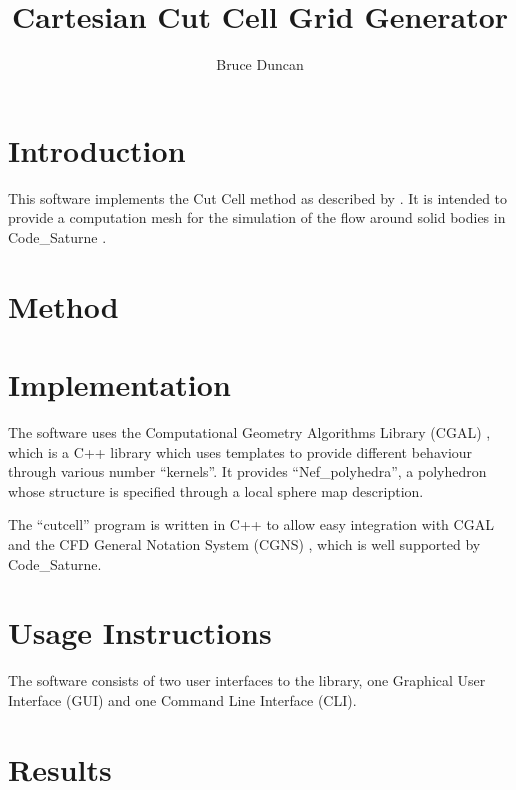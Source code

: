 \documentclass[a4paper,10pt]{article}
\title{Cartesian Cut Cell Grid Generator}
\author{Bruce Duncan}
\begin{document}
\maketitle

\section{Introduction}

This software implements the Cut Cell method as described by \cite{dingram}. It
is intended to provide a computation mesh for the simulation of the flow around
solid bodies in Code\_Saturne \cite{code_saturne}.

\section{Method}

\section{Implementation}

The software uses the Computational Geometry Algorithms Library (CGAL)
\cite{cgal}, which is a C++ library which uses templates to provide different
behaviour through various number ``kernels''. It provides ``Nef\_polyhedra'', a
polyhedron whose structure is specified through a local sphere map description.

The ``cutcell'' program is written in C++ to allow easy integration with CGAL
and the CFD General Notation System (CGNS) \cite{cgns}, which is well supported
by Code\_Saturne.

\section{Usage Instructions}

The software consists of two user interfaces to the library, one Graphical User
Interface (GUI) and one Command Line Interface (CLI).

\section{Results}
\end{document}
